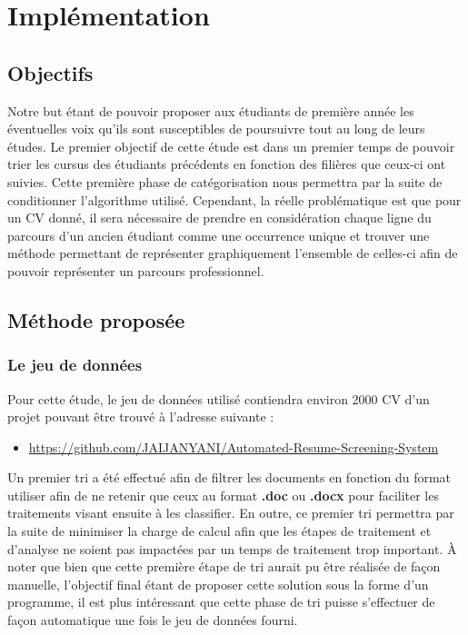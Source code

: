 \documentclass[memoire.tex]{subfiles}
\begin{document}
\chapter{Implémentation}

\section{Objectifs}

Notre but étant de pouvoir proposer aux étudiants de première année les éventuelles voix qu'ils sont susceptibles de poursuivre tout au long de leurs études. Le premier objectif de cette étude est dans un premier temps de pouvoir trier les cursus des étudiants précédents en fonction des filières que ceux-ci ont suivies. Cette première phase de catégorisation nous permettra par la suite de conditionner l'algorithme utilisé. Cependant, la réelle problématique est que pour un CV donné, il sera nécessaire de prendre en considération chaque ligne du parcours d'un ancien étudiant comme une occurrence unique et trouver une méthode permettant de représenter graphiquement l'ensemble de celles-ci afin de pouvoir représenter un parcours professionnel.

\section{Méthode proposée}

\subsection{Le jeu de données}

Pour cette étude, le jeu de données utilisé contiendra environ 2000 CV  d'un projet pouvant être trouvé à l'adresse suivante : \begin{itemize}
\item \url{https://github.com/JAIJANYANI/Automated-Resume-Screening-System}
\end{itemize}
Un premier tri a été effectué afin de filtrer les documents en fonction du format utiliser afin de ne retenir que ceux au format \textbf{.doc} ou \textbf{.docx} pour faciliter les traitements visant ensuite à les classifier. En outre, ce premier tri permettra par la suite de minimiser la charge de calcul afin que les étapes de traitement et d'analyse ne soient pas impactées par un temps de traitement trop important. À noter que bien que cette première étape de tri aurait pu être réalisée de façon manuelle, l'objectif final étant de proposer cette solution sous la forme d'un programme, il est plus intéressant que cette phase de tri puisse s'effectuer de façon automatique une fois le jeu de données fourni.
\end{document}
